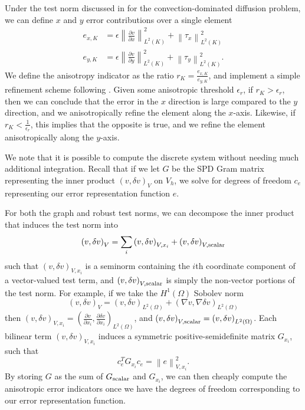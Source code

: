 \documentclass[11pt,onecolumn]{scrartcl}
\newcommand{\nor}[1]{\left\| #1 \right\|}
\newcommand{\LRp}[1]{\left( #1 \right)}
\renewcommand{\L}{L^2\LRp{\Omega}}
\newcommand{\grad}{\nabla}
\newcommand{\pd}[2]{\frac{\partial#1}{\partial#2}}
\begin{document}
Under the test norm discussed in \cite{ChanHeuerBui-ThanhDemkowicz12} for the convection-dominated diffusion problem, we can define $x$ and $y$ error contributions over a single element
\begin{align*}
e_{x,K} &= \epsilon \nor{\pd{v}{x}}_{L^2(K)}^2 + \nor{\tau_x}_{L^2(K)}^2 \\
e_{y,K} &= \epsilon \nor{\pd{v}{y}}_{L^2(K)}^2 + \nor{\tau_y}_{L^2(K)}^2.
\end{align*}
We define the anisotropy indicator as the ratio $r_K = \frac{e_{x,K}}{e_{y,K}}$, and implement a simple refinement scheme following \cite{DPG3}.  Given some anisotropic threshold $\epsilon_r$, if $r_K>\epsilon_r$, then we can conclude that the error in the $x$ direction is large compared to the $y$ direction, and we anisotropically refine the element along the $x$-axis.  Likewise, if $r_K < \frac{1}{\epsilon_r}$, this implies that the opposite is true, and we refine the element anisotropically along the $y$-axis.  

We note that it is possible to compute the discrete system without needing much additional integration.  Recall that if we let $G$ be the SPD Gram matrix representing the inner product $\LRp{v,\delta v}_V$ on $V_h$, we solve for degrees of freedom $c_e$ representing our error representation function $e$.  

For both the graph and robust test norms, we can decompose the inner product that induces the test norm into 
\[
\LRp{v,\delta v}_V = \sum_i \LRp{v,\delta v}_{V,x_i} + \LRp{v,\delta v}_{V,{\rm scalar}}
\]
such that $\LRp{v,\delta v}_{V,x_i}$ is a seminorm containing the $i$th coordinate component of a vector-valued test term, and $\LRp{v,\delta v}_{V,{\rm scalar}}$ is simply the non-vector portions of the test norm.  For example, if we take the $H^1(\Omega)$ Sobolev norm
\[
\LRp{v,\delta v}_V = \LRp{v,\delta v}_{\L} + \LRp{\grad v,\grad \delta v}_{\L}
\]
then $\LRp{v,\delta v}_{V,x_i} = \LRp{\pd{v}{x_i},\pd{\delta v}{x_i}}_{\L}$, and $\LRp{v,\delta v}_{V,{\rm scalar}} = \LRp{v,\delta v}_{\L}$.  Each bilinear term $\LRp{v,\delta v}_{V,x_i}$ induces a symmetric positive-semidefinite matrix $G_{x_i}$, such that 
\[
c_e^TG_{x_i}c_e = \nor{e}^2_{V,x_i}.
\]
By storing $G$ as the sum of $G_{\rm scalar}$ and $G_{x_i}$, we can then cheaply compute the anisotropic error indicators once we have the degrees of freedom corresponding to our error representation function.  
\end{document}
